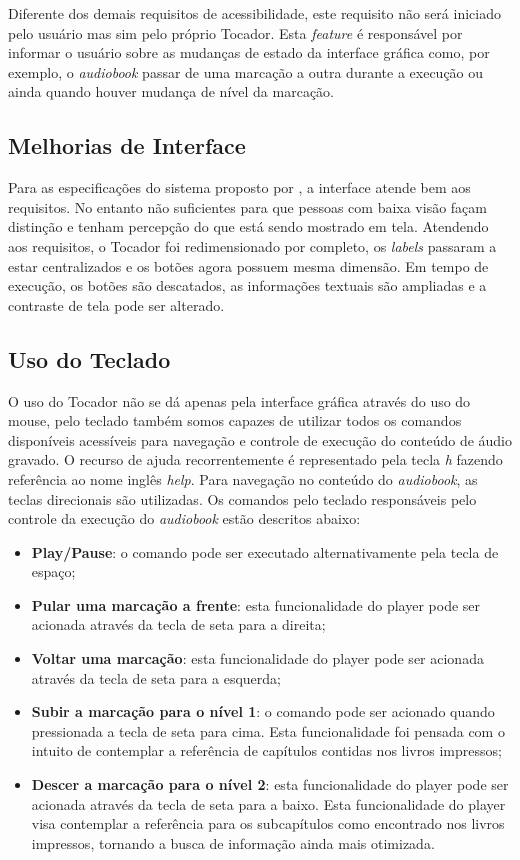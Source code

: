 Diferente dos demais requisitos de acessibilidade, este requisito não será iniciado pelo usuário mas sim pelo próprio Tocador. Esta \textit{feature} é responsável por informar o usuário sobre as mudanças de estado da interface gráfica como, por exemplo, o \textit{audiobook} passar de uma marcação a outra durante a execução ou ainda quando houver mudança de nível da marcação.

\subsection{Melhorias de Interface}

Para as especificações do sistema proposto por \cite{herbert}, a interface atende bem aos requisitos. No entanto não suficientes para que pessoas com baixa visão façam distinção e tenham percepção do que está sendo mostrado em tela. Atendendo aos requisitos, o Tocador foi redimensionado por completo, os \textit{labels} passaram a estar centralizados e os botões agora possuem mesma dimensão. Em tempo de execução, os botões são descatados, as informações textuais são ampliadas e a contraste de tela pode ser alterado.

\subsection{Uso do Teclado}

O uso do Tocador não se dá apenas pela interface gráfica através do uso do mouse, pelo teclado também somos capazes de utilizar todos os comandos disponíveis acessíveis para navegação e controle de execução do conteúdo de áudio gravado. O recurso de ajuda recorrentemente é representado pela tecla \textit{h} fazendo referência ao nome inglês \textit{help}. Para navegação no conteúdo do \textit{audiobook}, as teclas direcionais são utilizadas. Os comandos pelo teclado responsáveis pelo controle da execução do \textit{audiobook} estão descritos abaixo:

\begin{itemize}
	\item{\textbf{Play/Pause}:} o comando pode ser executado alternativamente pela tecla de espaço;
	\item{\textbf{Pular uma marcação a frente}:} esta funcionalidade do player pode ser acionada através da tecla de seta para a direita;
	\item{\textbf{Voltar uma marcação}:} esta funcionalidade do player pode ser acionada através da tecla de seta para a esquerda;
	\item{\textbf{Subir a marcação para o nível 1}:} o comando pode ser acionado quando pressionada a tecla de seta para cima. Esta funcionalidade foi pensada com o intuito de contemplar a referência de capítulos contidas nos livros impressos;
	\item{\textbf{Descer a marcação para o nível 2}:} esta funcionalidade do player pode ser acionada através da tecla de seta para a baixo. Esta funcionalidade do player visa contemplar a referência para os subcapítulos como encontrado nos livros impressos, tornando a busca de informação ainda mais otimizada.
\end{itemize}

